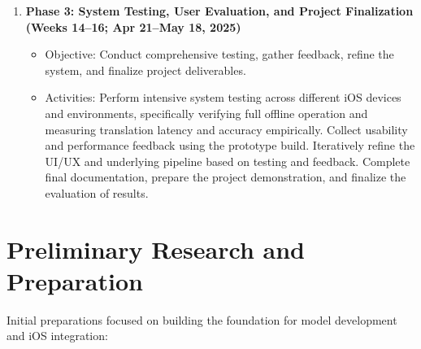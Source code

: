\documentclass[12pt]{article}
\begin{document}
\begin{enumerate}
    \item \textbf{Phase 3: System Testing, User Evaluation, and Project Finalization (Weeks 14--16; Apr 21--May 18, 2025)}
    \begin{itemize}
        \item Objective: Conduct comprehensive testing, gather feedback, refine the system, and finalize project deliverables.
        \item Activities: Perform intensive system testing across different iOS devices and environments, specifically verifying full offline operation and measuring translation latency and accuracy empirically. Collect usability and performance feedback using the prototype build. Iteratively refine the UI/UX and underlying pipeline based on testing and feedback. Complete final documentation, prepare the project demonstration, and finalize the evaluation of results.
    \end{itemize}
\end{enumerate}

\section{Preliminary Research and Preparation}

Initial preparations focused on building the foundation for model development and iOS integration:
\end{document}

